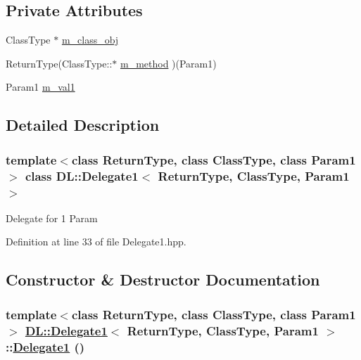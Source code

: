 \subsection*{Private Attributes}
\begin{CompactItemize}
\item 
Class\-Type $\ast$ \hyperlink{classDL_1_1Delegate1_r0}{m\_\-class\_\-obj}
\item 
Return\-Type(Class\-Type::$\ast$ \hyperlink{classDL_1_1Delegate1_r1}{m\_\-method} )(Param1)
\item 
Param1 \hyperlink{classDL_1_1Delegate1_r2}{m\_\-val1}
\end{CompactItemize}


\subsection{Detailed Description}
\subsubsection*{template$<$class Return\-Type, class Class\-Type, class Param1$>$ class DL::Delegate1$<$ Return\-Type, Class\-Type, Param1 $>$}

Delegate for 1 Param



Definition at line 33 of file Delegate1.hpp.

\subsection{Constructor \& Destructor Documentation}
\hypertarget{classDL_1_1Delegate1_d0}{
\subsubsection[Delegate1]{\setlength{\rightskip}{0pt plus 5cm}template$<$class Return\-Type, class Class\-Type, class Param1$>$ \hyperlink{classDL_1_1Delegate1}{DL::Delegate1}$<$ Return\-Type, Class\-Type, Param1 $>$::\hyperlink{classDL_1_1Delegate1}{Delegate1} ()}}
\label{classDL_1_1Delegate1_d0}




